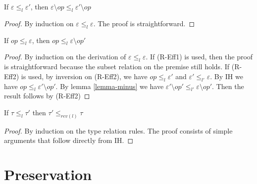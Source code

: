\begin{lemma}
\label{lemma-minus}
If $\varepsilon \leq_l \varepsilon'$, then $\varepsilon \setminus op \leq_l \varepsilon' \setminus op$
\begin{proof}
By induction on $\varepsilon \leq_l \varepsilon$. The proof is straightforward.
\end{proof}

\end{lemma}

\begin{lemma}
\label{lemma-relation}
If $op \leq_{l} \varepsilon$, then $op \leq_{l} \varepsilon \setminus op'$
\begin{proof}
By induction on the derivation of $\varepsilon \leq_l \varepsilon$. If (R-Eff1) is used, then the proof is straightforward because the subset relation on the premise still holds. If (R-Eff2) is used, by inversion on (R-Eff2), we have $op \leq_l \varepsilon'$ and $\varepsilon' \leq_{l'} \varepsilon$. By IH we have $op \leq_l \varepsilon' \setminus op'$. By lemma \ref{lemma-minus} we have $\varepsilon'  \setminus op' \leq_{l'} \varepsilon \setminus op'$. Then the result follows by (R-Eff2)
\end{proof}
\end{lemma}

\begin{lemma}
\label{lemma-relation2}
If $\tau \leq_l \tau'$ then $\tau' \leq_{rev(l)} \tau$
\begin{proof}
By induction on the type relation rules. The proof consists of simple arguments that follow directly from IH.  
\end{proof}
\end{lemma}

\section{Preservation}

